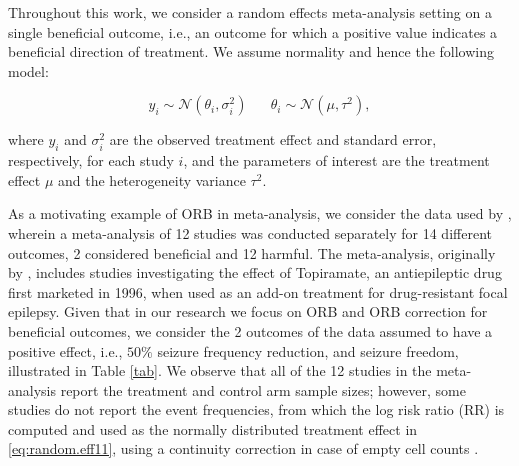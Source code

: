 \documentclass[twocolumn]{article}\usepackage[]{graphicx}\usepackage[]{xcolor}
\providecommand{\DIFaddend}{} %
\DeclareRobustCommand{\DIFaddend}{\DIFOaddend \let\includegraphics\DIFOincludegraphics} %
\begin{document}
\DIFaddend Throughout this work, we consider a random effects meta-analysis setting on a single beneficial outcome, i.e., an outcome for which a positive value indicates a beneficial direction of treatment. We assume normality and hence the following model:

\bigskip

\begin{equation}\label{eq:random.eff11}
y_i \sim \mathcal{N}(\theta_i, \sigma_i^2) \; \; \; \; \; \; \theta_i \sim \mathcal{N}(\mu, \tau^2),
\end{equation}

\bigskip

where $y_i$ and $\sigma_i^2$ are the observed treatment effect and standard error, respectively, for each study $i$, and the parameters of interest are the treatment effect $\mu$ and the heterogeneity variance $\tau^2$.

As a motivating example of ORB in meta-analysis, we consider the data used by \citet{Copas2019}, wherein a meta-analysis of 12 studies was conducted separately for 14 different outcomes, 2 considered beneficial and 12 harmful. The meta-analysis, originally by \citet{topiramate}, includes studies investigating the effect of Topiramate, an antiepileptic drug first marketed in 1996, when used as an add-on treatment for drug-resistant focal epilepsy. Given that in our research we focus on ORB and ORB correction for beneficial outcomes, we consider the 2 outcomes of the data assumed to have a positive effect, i.e., $50 \%$ seizure frequency reduction, and seizure freedom, illustrated in Table \ref{tab}. We observe that all of the 12 studies in the meta-analysis report the treatment and control arm sample sizes; however, some studies do not report the event frequencies, from which the log risk ratio (RR) is computed and used as the normally distributed treatment effect in \eqref{eq:random.eff11}, using a continuity correction in case of empty cell counts \citep{Copas2019}.
\end{document}
